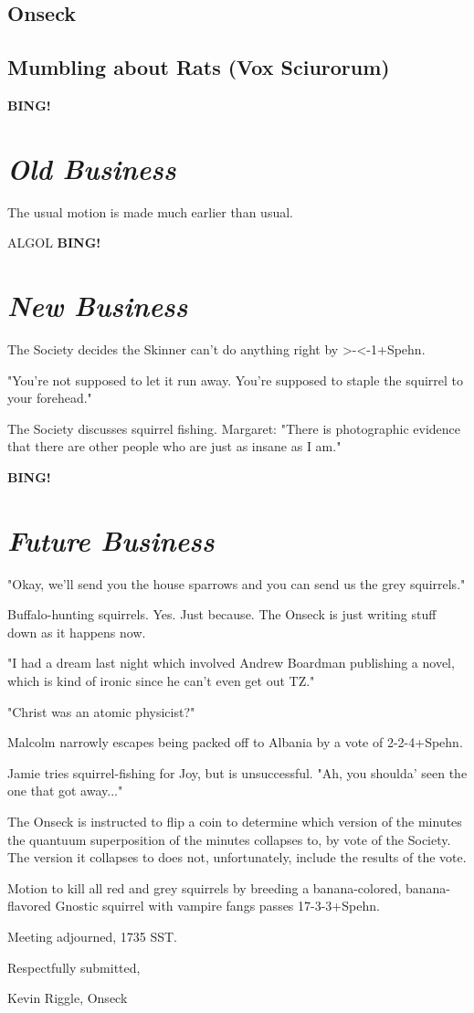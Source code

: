 \documentclass[10pt]{article}
\newcommand{\bing}{{\bf BING!} }
\newcommand{\goto}[1]{\bing \vskip 12pt \section*{{\em{#1}}}}
\begin{document}
\subsection*{Onseck}

\subsection*{Mumbling about Rats (Vox Sciurorum)}

\goto{Old Business}

The usual motion is made much earlier than usual.

ALGOL
\goto{New Business}

The Society decides the Skinner can't do anything right by >-<-1+Spehn.

"You're not supposed to let it run away.  You're supposed to staple the
squirrel to your forehead."

The Society discusses squirrel fishing.
Margaret: "There is photographic evidence that there are other people who are 
just as insane as I am."

\goto{Future Business}

"Okay, we'll send you the house sparrows and you can send us the grey squirrels."

Buffalo-hunting squirrels.  Yes.  Just because.  The Onseck is just writing
stuff down as it happens now.

"I had a dream last night which involved Andrew Boardman publishing a novel,
which is kind of ironic since he can't even get out TZ."

"Christ was an atomic physicist?"

Malcolm narrowly escapes being packed off to Albania by a vote of 2-2-4+Spehn.

Jamie tries squirrel-fishing for Joy, but is unsuccessful.  "Ah, you shoulda'
seen the one that got away..."

The Onseck is instructed to flip a coin to determine which version of the
minutes the quantuum superposition of the minutes collapses to, by vote of
the Society.  The version it collapses to does not, unfortunately, include 
the results of the vote.

Motion to kill all red and grey squirrels by breeding a banana-colored, 
banana-flavored Gnostic squirrel with vampire fangs passes 17-3-3+Spehn.

\vspace{12pt}

\noindent
Meeting adjourned, 1735 SST.

\vspace{18pt}

\centerline{Respectfully submitted,}
\centerline{Kevin Riggle, Onseck}
\end{document}

